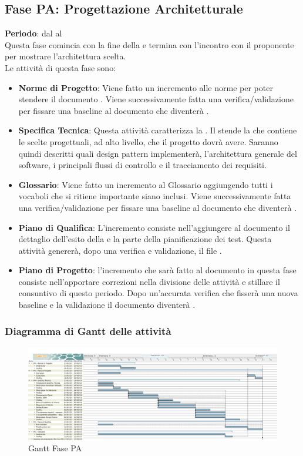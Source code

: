\subsection{Fase PA: Progettazione Architetturale}
	\textbf{Periodo}: dal  al  \\Questa fase comincia con la fine della  e termina con l'incontro con il proponente per mostrare l'architettura scelta.\\
	Le attività di questa fase sono:
	\begin{itemize}
		\item \textbf{Norme di Progetto}: Viene fatto un incremento alle norme per poter stendere il documento . Viene successivamente fatta una verifica/validazione per fissare una baseline al documento che diventerà .
		\item \textbf{Specifica Tecnica}: Questa attività caratterizza la . Il  stende la  che contiene le scelte progettuali, ad alto livello, che il progetto dovrà avere. Saranno quindi descritti quali design pattern \projectname{} implementerà, l'architettura generale del software, i principali flussi di controllo e il tracciamento dei requisiti.
		\item \textbf{Glossario}: Viene fatto un incremento al Glossario aggiungendo tutti i vocaboli che si ritiene importante siano inclusi. Viene successivamente fatta una verifica/validazione per fissare una baseline al documento che diventerà .
		\item \textbf{Piano di Qualifica}: L'incremento consiste nell'aggiungere al documento  il dettaglio dell'esito della  e la parte della pianificazione dei test. Questa attività genererà, dopo una verifica e validazione, il file .
		\item \textbf{Piano di Progetto}: l'incremento che sarà fatto al documento  in questa fase consiste nell'apportare correzioni nella divisione delle attività e stillare il consuntivo di questo periodo. Dopo un'accurata verifica che fisserà una nuova baseline e la validazione il documento diventerà .
	\end{itemize}
	\subsubsection{Diagramma di Gantt delle attività}
	\begin{figure}[H]\centering
		\includegraphics[width=\textwidth]{PianoDiProgetto/Pics/FasePA.png}
	\caption{Gantt Fase PA}
\end{figure}
